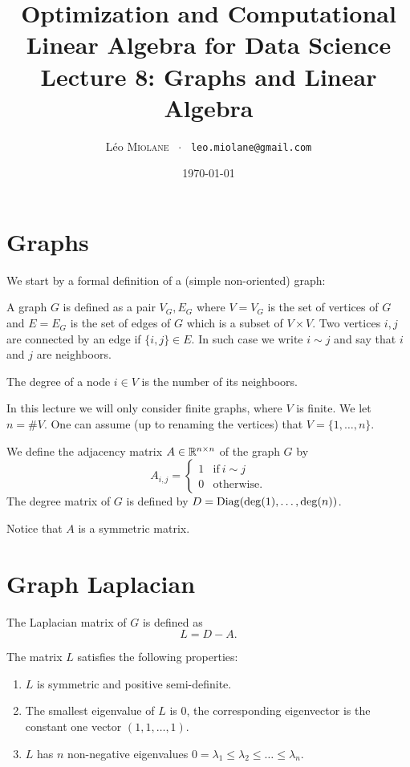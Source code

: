 \documentclass[11pt,nocut]{article}
\title{\vspace{-2.0cm}%
	Optimization and Computational Linear Algebra for Data Science\\
Lecture 8: Graphs and Linear Algebra}
\author{Léo \textsc{Miolane} \ $\cdot$ \ \texttt{leo.miolane@gmail.com}}
\date{\today}
\begin{document}
\maketitle


\section{Graphs}

We start by a formal definition of a (simple non-oriented) graph:
\begin{definition}[Graph]
	A graph $G$ is defined as a pair $V_G,E_G$ where $V=V_G$ is the set of vertices of $G$ and $E = E_G$ is the set of edges of $G$ which is a subset of $V \times V$.
	Two vertices $i,j$ are connected by an edge if $\{i,j\} \in E$. In such case we write $i \sim j$ and say that $i$ and $j$ are neighboors.
\end{definition}

\begin{definition}
	The degree of a node $i \in V$ is the number of its neighboors.
\end{definition}

In this lecture we will only consider finite graphs, where $V$ is finite. We let $n = \# V$. One can assume (up to renaming the vertices) that $V = \{1, \dots, n\}$.

\begin{definition}
	We define the adjacency matrix $A \in \mathbb{R}^{n \times n}$ of the graph $G$ by
	$$
	A_{i,j} = 
	\begin{cases}
		1 & \text{if} \ i \sim j \\
		0 & \text{otherwise.}
	\end{cases}
	$$
	The degree matrix of $G$ is defined by $D = {{\rm Diag}}({\rm deg}(1), \dots, {\rm deg}(n))$. 
\end{definition}

Notice that $A$ is a symmetric matrix.

\section{Graph Laplacian}

\begin{definition}
	The Laplacian matrix of $G$ is defined as
	$$
	L = D - A.
	$$
\end{definition}

\begin{proposition}
	The matrix $L$ satisfies the following properties:
	\begin{enumerate}
		\item $L$ is symmetric and positive semi-definite.
		\item The smallest eigenvalue of $L$ is $0$, the corresponding eigenvector is the constant one vector $(1,1, \dots, 1)$.
		\item $L$ has $n$ non-negative eigenvalues $0 = \lambda_1 \leq \lambda_2 \leq \dots \leq \lambda_n$.
	\end{enumerate}
\end{proposition}
\end{document}

